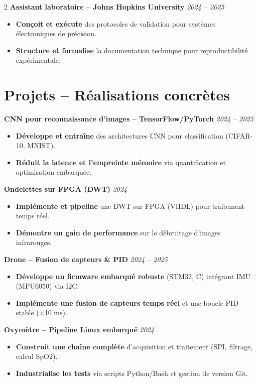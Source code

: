 \documentclass[10pt,a4paper]{article}
\begin{document}
\begin{multicols}{2}
\textbf{Assistant laboratoire – Johns Hopkins University} \hfill \textit{2024 – 2025}
\begin{itemize}[leftmargin=*]
    \item \textbf{Conçoit et exécute} des protocoles de validation pour systèmes électroniques de précision.
    \item \textbf{Structure et formalise} la documentation technique pour reproductibilité expérimentale.
\end{itemize}

\section*{Projets – Réalisations concrètes}
\textbf{CNN pour reconnaissance d’images – TensorFlow/PyTorch} \hfill \textit{2024 – 2025}
\begin{itemize}[leftmargin=*]
    \item \textbf{Développe et entraîne} des architectures CNN pour classification (CIFAR-10, MNIST).
    \item \textbf{Réduit la latence et l’empreinte mémoire} via quantification et optimisation embarquée.
\end{itemize}

\textbf{Ondelettes sur FPGA (DWT)} \hfill \textit{2024}
\begin{itemize}[leftmargin=*]
    \item \textbf{Implémente et pipeline} une DWT sur FPGA (VHDL) pour traitement temps réel.
    \item \textbf{Démontre un gain de performance} sur le débruitage d’images infrarouges.
\end{itemize}

\textbf{Drone – Fusion de capteurs \& PID} \hfill \textit{2024 – 2025}
\begin{itemize}[leftmargin=*]
    \item \textbf{Développe un firmware embarqué robuste} (STM32, C) intégrant IMU (MPU6050) via I2C.
    \item \textbf{Implémente une fusion de capteurs temps réel} et une boucle PID stable (<10 ms).
\end{itemize}

\textbf{Oxymètre – Pipeline Linux embarqué} \hfill \textit{2024}
\begin{itemize}[leftmargin=*]
    \item \textbf{Construit une chaîne complète} d’acquisition et traitement (SPI, filtrage, calcul SpO2).
    \item \textbf{Industrialise les tests} via scripts Python/Bash et gestion de version Git.
\end{itemize}


\end{multicols}
\end{document}
